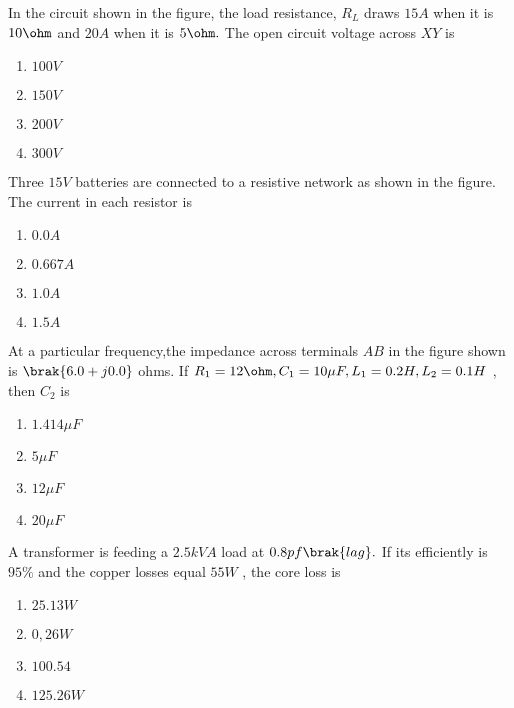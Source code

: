     \item In the circuit shown in the figure, the load resistance, $R_{L}$ draws $15 A$ when it is $10\ohm$ and $20 A$ when it is $5\ohm.$ The open circuit voltage across $XY$ is 
    \begin{enumerate}
        \item $100 V$
        \item $150 V$
        \item $200 V$
        \item $300 V$ \\
    \end{enumerate}
    

    \item Three $15 V$ batteries are connected to a resistive network as shown in the figure. The current in each resistor is 
    \begin{enumerate}
        \item $0.0 A$
        \item $0.667 A$
        \item $1.0 A$
        \item $1.5 A$ \\
    \end{enumerate}


    \item At a particular frequency,the impedance across terminals $AB$ in the figure shown is $\brak{6.0 + j 0.0}$ ohms. If $R_{1} = 12 \ohm , C_{1} = 10 \mu F , L_{1} = 0.2 H , L_{2} = 0.1 H$ , then $C_{2}$ is 
    \begin{enumerate}
        \item $1.414 \mu F$
        \item $5 \mu F$
        \item $12 \mu F$
        \item $20 \mu F$\\
    \end{enumerate}

    \item A transformer is feeding a $2.5 kVA$ load at $0.8 pf \brak{lag}.$ If its efficiently is $95 \%$ and the copper losses equal $55 W$ , the core loss is  
    \begin{enumerate}
        \item $25.13 W$
        \item $0,26 W$
        \item $100.54$
        \item $125.26 W$\\
    \end{enumerate}

